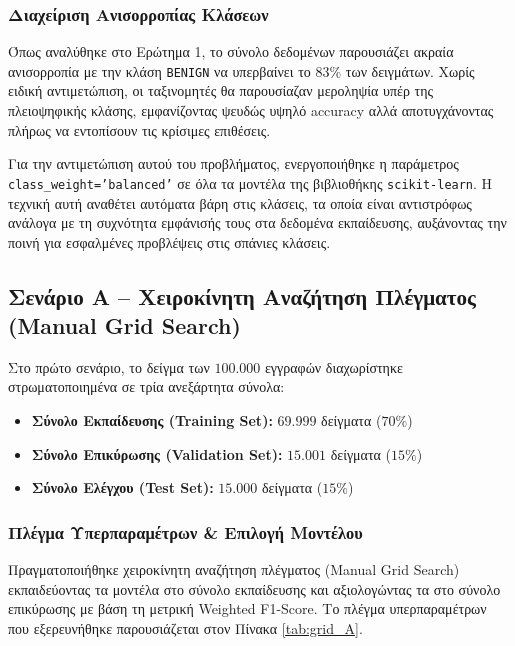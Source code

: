 \documentclass[11pt,a4paper]{article}
\newcommand{\eng}[1]{\textlatin{#1}}
\begin{document}
\subsubsection{Διαχείριση Ανισορροπίας Κλάσεων}
Όπως αναλύθηκε στο Ερώτημα 1, το σύνολο δεδομένων παρουσιάζει ακραία ανισορροπία με την κλάση \texttt{\eng{BENIGN}} να υπερβαίνει το $83\%$ των δειγμάτων. Χωρίς ειδική αντιμετώπιση, οι ταξινομητές θα παρουσίαζαν μεροληψία υπέρ της πλειοψηφικής κλάσης, εμφανίζοντας ψευδώς υψηλό \eng{accuracy} αλλά αποτυγχάνοντας πλήρως να εντοπίσουν τις κρίσιμες επιθέσεις.

Για την αντιμετώπιση αυτού του προβλήματος, ενεργοποιήθηκε η παράμετρος \texttt{\eng{class\_weight='balanced'}} σε όλα τα μοντέλα της βιβλιοθήκης \texttt{\eng{scikit-learn}}. Η τεχνική αυτή αναθέτει αυτόματα βάρη στις κλάσεις, τα οποία είναι αντιστρόφως ανάλογα με τη συχνότητα εμφάνισής τους στα δεδομένα εκπαίδευσης, αυξάνοντας την ποινή για εσφαλμένες προβλέψεις στις σπάνιες κλάσεις.

\subsection{Σενάριο Α -- Χειροκίνητη Αναζήτηση Πλέγματος (\eng{Manual Grid Search})}
Στο πρώτο σενάριο, το δείγμα των $100.000$ εγγραφών διαχωρίστηκε στρωματοποιημένα σε τρία ανεξάρτητα σύνολα:
\begin{itemize}
    \item \textbf{Σύνολο Εκπαίδευσης (\eng{Training Set}):} $69.999$ δείγματα ($70\%$)
    \item \textbf{Σύνολο Επικύρωσης (\eng{Validation Set}):} $15.001$ δείγματα ($15\%$)
    \item \textbf{Σύνολο Ελέγχου (\eng{Test Set}):} $15.000$ δείγματα ($15\%$)
\end{itemize}

\subsubsection{Πλέγμα Υπερπαραμέτρων \& Επιλογή Μοντέλου}
Πραγματοποιήθηκε χειροκίνητη αναζήτηση πλέγματος (\eng{Manual Grid Search}) εκπαιδεύοντας τα μοντέλα στο σύνολο εκπαίδευσης και αξιολογώντας τα στο σύνολο επικύρωσης με βάση τη μετρική \eng{Weighted F1-Score}. Το πλέγμα υπερπαραμέτρων που εξερευνήθηκε παρουσιάζεται στον Πίνακα \ref{tab:grid_A}.
\end{document}
